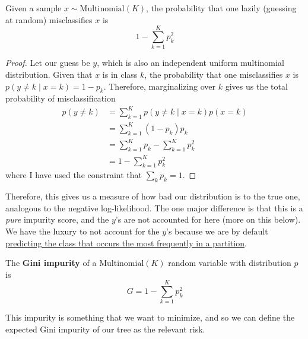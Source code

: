   \begin{lemma}
    Given a sample $x \sim \mathrm{Multinomial}(K)$, the probability that one lazily (guessing at random) misclassifies $x$ is 
    \begin{equation}
      1 - \sum_{k=1}^K p_k^2
    \end{equation}
  \end{lemma}
  \begin{proof}
    Let our guess be $y$, which is also an independent uniform multinomial distribution. Given that $x$ is in class $k$, the probability that one misclassifies $x$ is $p(y \neq k \mid x = k) = 1 - p_k$. Therefore, marginalizing over $k$ gives us the total probability of misclassification 
    \begin{align}
      p(y \neq k) & = \sum_{k=1}^K p(y \neq k \mid x = k) p(x = k) \\ 
                  & = \sum_{k=1}^K (1 - p_k) p_k \\ 
                  & = \sum_{k=1}^K p_k - \sum_{k=1}^K p_k^2 \\ 
                  & = 1 - \sum_{k=1}^K p_k^2
    \end{align}
    where I have used the constraint that $\sum_k p_k = 1$. 
  \end{proof}

  Therefore, this gives us a measure of how bad our distribution is to the true one, analogous to the negative log-likelihood. The one major difference is that this is a \textit{pure} impurity score, and the $y$'s are not accounted for here (more on this below). We have the luxury to not account for the $y$'s because we are by default \hyperlink{frequent}{predicting the class that occurs the most frequently in a partition}. 

  \begin{definition}
    The \textbf{Gini impurity} of a $\mathrm{Multinomial}(K)$ random variable with distribution $p$ is 
    \begin{equation}
      G = 1 - \sum_{k=1}^K p_k^2
    \end{equation}
  \end{definition}

  This impurity is something that we want to minimize, and so we can define the expected Gini impurity of our tree as the relevant risk. 

